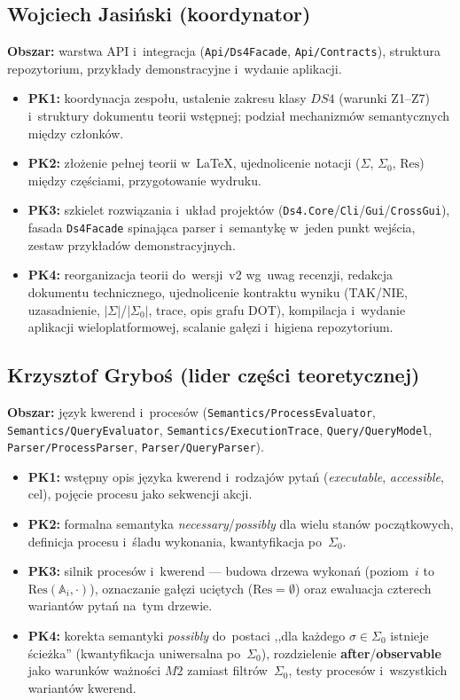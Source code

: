 \documentclass[11pt,a4paper]{article}
\newcommand{\Res}{\mathrm{Res}}
\begin{document}
\subsection*{Wojciech Jasiński (koordynator)}
\textbf{Obszar:} warstwa API i~integracja (\texttt{Api/Ds4Facade}, \texttt{Api/Contracts}), struktura repozytorium, przykłady demonstracyjne i~wydanie aplikacji.
\begin{itemize}\setlength\itemsep{0.1em}
  \item \textbf{PK1:} koordynacja zespołu, ustalenie zakresu klasy $\mathit{DS4}$ (warunki Z1--Z7) i~struktury dokumentu teorii wstępnej; podział mechanizmów semantycznych między członków.
  \item \textbf{PK2:} złożenie pełnej teorii w~\LaTeX{}, ujednolicenie notacji ($\Sigma$, $\Sigma_0$, $\Res$) między częściami, przygotowanie wydruku.
  \item \textbf{PK3:} szkielet rozwiązania i~układ projektów (\texttt{Ds4.Core}/\texttt{Cli}/\texttt{Gui}/\texttt{CrossGui}), fasada \texttt{Ds4Facade} spinająca parser i~semantykę w~jeden punkt wejścia, zestaw przykładów demonstracyjnych.
  \item \textbf{PK4:} reorganizacja teorii do~wersji~v2 wg~uwag recenzji, redakcja dokumentu technicznego, ujednolicenie kontraktu wyniku (TAK/NIE, uzasadnienie, $|\Sigma|$/$|\Sigma_0|$, trace, opis grafu DOT), kompilacja i~wydanie aplikacji wieloplatformowej, scalanie gałęzi i~higiena repozytorium.
\end{itemize}

\subsection*{Krzysztof Gryboś (lider części teoretycznej)}
\textbf{Obszar:} język kwerend i~procesów (\texttt{Semantics/ProcessEvaluator}, \texttt{Semantics/QueryEvaluator}, \texttt{Semantics/ExecutionTrace}, \texttt{Query/QueryModel}, \texttt{Parser/ProcessParser}, \texttt{Parser/QueryParser}).
\begin{itemize}\setlength\itemsep{0.1em}
  \item \textbf{PK1:} wstępny opis języka kwerend i~rodzajów pytań (\textit{executable}, \textit{accessible}, cel), pojęcie procesu jako sekwencji akcji.
  \item \textbf{PK2:} formalna semantyka \textit{necessary}/\textit{possibly} dla wielu stanów początkowych, definicja procesu i~śladu wykonania, kwantyfikacja po~$\Sigma_0$.
  \item \textbf{PK3:} silnik procesów i~kwerend --- budowa drzewa wykonań (poziom~$i$ to $\Res(\mathbb{A}_i,\cdot)$), oznaczanie gałęzi uciętych ($\Res=\emptyset$) oraz ewaluacja czterech wariantów pytań na~tym drzewie.
  \item \textbf{PK4:} korekta semantyki \textit{possibly} do~postaci ,,dla każdego $\sigma\in\Sigma_0$ istnieje ścieżka'' (kwantyfikacja uniwersalna po~$\Sigma_0$), rozdzielenie \textbf{after}/\textbf{observable} jako warunków ważności $M2$ zamiast filtrów~$\Sigma_0$, testy procesów i~wszystkich wariantów kwerend.
\end{itemize}
\end{document}
